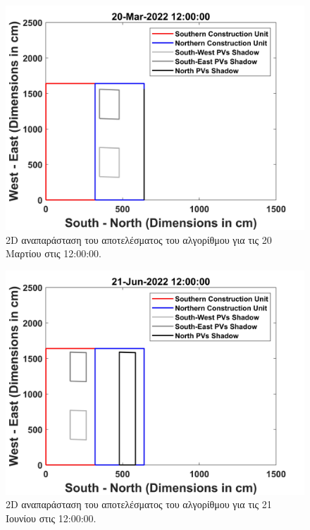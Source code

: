 \documentclass[12pt, a4paper]{report} %
\newcommand{\english}{\foreignlanguage{english}}
\begin{document}
\begin{figure}[h]%
    \centering
    \includegraphics[scale = 0.073]{Figures/2D_mar.jpg}
    \caption{\english{2D} αναπαράσταση του αποτελέσματος του αλγορίθμου για τις 20 Μαρτίου στις 12:00:00.}
    \label{fig_2D_mar}
\end{figure}

\begin{figure}[h]%
    \centering
    \includegraphics[scale = 0.073]{Figures/2D_jun.jpg}
    \caption{\english{2D} αναπαράσταση του αποτελέσματος του αλγορίθμου για τις 21 Ιουνίου στις 12:00:00.}
    \label{fig_2D_jun}
\end{figure}

\clearpage
\end{document}
